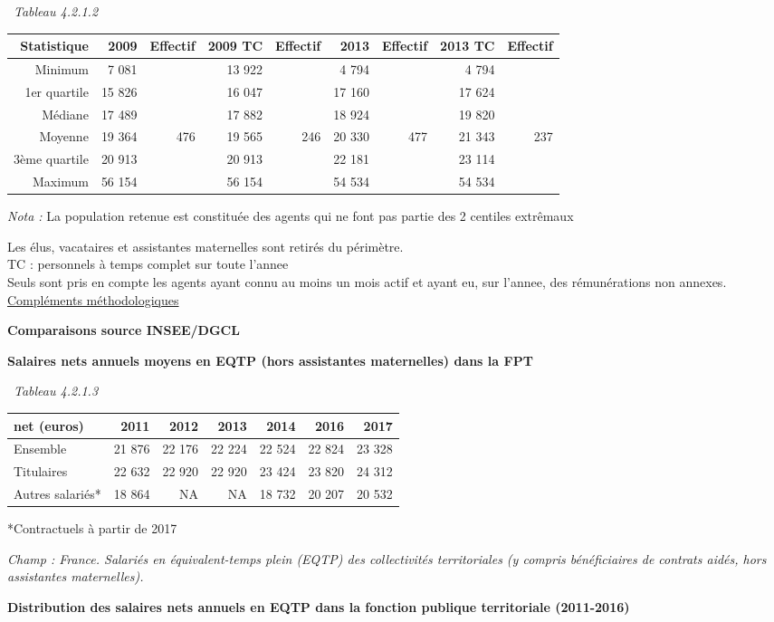 ~\emph{Tableau 4.2.1.2}

\begin{longtable}[]{@{}rrrrrrrrr@{}}
\toprule
Statistique & 2009 & Effectif & 2009 TC & Effectif & 2013 & Effectif &
2013 TC & Effectif\tabularnewline
\midrule
\endhead
Minimum & 7 081 & & 13 922 & & 4 794 & & 4 794 &\tabularnewline
1er quartile & 15 826 & & 16 047 & & 17 160 & & 17 624 &\tabularnewline
Médiane & 17 489 & & 17 882 & & 18 924 & & 19 820 &\tabularnewline
Moyenne & 19 364 & 476 & 19 565 & 246 & 20 330 & 477 & 21 343 &
237\tabularnewline
3ème quartile & 20 913 & & 20 913 & & 22 181 & & 23 114 &\tabularnewline
Maximum & 56 154 & & 56 154 & & 54 534 & & 54 534 &\tabularnewline
\bottomrule
\end{longtable}

\emph{Nota :} La population retenue est constituée des agents qui ne
font pas partie des 2 centiles extrêmaux

Les élus, vacataires et assistantes maternelles sont retirés du
périmètre.\\
TC : personnels à temps complet sur toute l'annee\\
Seuls sont pris en compte les agents ayant connu au moins un mois actif
et ayant eu, sur l'annee, des rémunérations non annexes.\\
\href{../Docs/méthodologie.pdf}{Compléments méthodologiques}

\textbf{Comparaisons source INSEE/DGCL}

\textbf{Salaires nets annuels moyens en EQTP (hors assistantes
maternelles) dans la FPT}

~\emph{Tableau 4.2.1.3}

\begin{longtable}[]{@{}lrrrrrr@{}}
\toprule
net (euros) & 2011 & 2012 & 2013 & 2014 & 2016 & 2017\tabularnewline
\midrule
\endhead
Ensemble & 21 876 & 22 176 & 22 224 & 22 524 & 22 824 & 23
328\tabularnewline
Titulaires & 22 632 & 22 920 & 22 920 & 23 424 & 23 820 & 24
312\tabularnewline
Autres salariés* & 18 864 & NA & NA & 18 732 & 20 207 & 20
532\tabularnewline
\bottomrule
\end{longtable}

*Contractuels à partir de 2017

\emph{Champ : France. Salariés en équivalent-temps plein (EQTP) des
collectivités territoriales (y compris bénéficiaires de contrats aidés,
hors assistantes maternelles).}

\textbf{Distribution des salaires nets annuels en EQTP dans la fonction
publique territoriale (2011-2016)}

